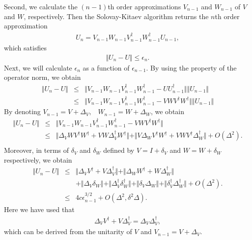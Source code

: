 Second, we calculate the $(n-1)$th order approximations $V_{n-1}$ and $W_{n-1}$ of $V$ and $W$, respectively. 
Then the Solovay-Kitaev algorithm returns the $n$th order approximation 
\begin{eqnarray}
U_n = V_{n-1} W_{n-1} V^{\dag}_{n-1} W^{\dag}_{n-1} U_{n-1},
\end{eqnarray}
which satisfies 
\begin{eqnarray}
\Vert  U_n - U \Vert  \leq \epsilon _{n}.
\end{eqnarray}
Next, we will calculate $\epsilon _{n}$ as a function of $\epsilon _{n-1}$.
By using the property of the operator norm, we obtain 
\begin{eqnarray}
\Vert  U_n - U \Vert  &\leq &
\Vert V_{n-1} W_{n-1} V^{\dag}_{n-1} W^{\dag}_{n-1} - U U_{n-1}^{\dag} \Vert  \Vert  U_{n-1} \Vert 
\\
&\leq& 
\Vert V_{n-1} W_{n-1} V^{\dag}_{n-1} W^{\dag}_{n-1} - VWV^{\dag}W^{\dag} \Vert 
 \Vert  U_{n-1} \Vert 
\end{eqnarray}
By denoting
$V_{n-1} = V+ \Delta _V, \;\;\;  W_{n-1} = W+ \Delta _W$,
we obtain
\begin{eqnarray}
\Vert  U_n - U \Vert  &\leq & \Vert V_{n-1} W_{n-1} V^{\dag}_{n-1} W^{\dag}_{n-1} - VWV^{\dag}W^{\dag} \Vert 
 \\ &\leq &
\Vert   \Delta _V W V^{\dag} W^{\dag} 
+ VW  \Delta_V^{\dag} W^{\dag}   \Vert 
+
\Vert   V \Delta _W V^{\dag} W^{\dag} 
+  VW V^{\dag} \Delta_W^{\dag} \Vert 
+O(\Delta ^2).
\nonumber \\
\end{eqnarray}
Moreover, in terms of $\delta _V$ and $\delta _W$
defined by $V= I+ \delta _V$ and $W = W+ \delta _W$
respectively,
we obtain
\begin{eqnarray}
 \Vert  U_n - U \Vert  &\leq &
\Vert   \Delta _V  V^{\dag} 
+ V  \Delta_V^{\dag}    \Vert  
+
\Vert   \Delta _W  W^{\dag} 
+  W \Delta_W^{\dag} \Vert  
\\
&&
+ \Vert \Delta _V \delta _{W}\Vert 
+\Vert \Delta _V^{\dag} \delta _{W}^{\dag}\Vert 
+\Vert  \delta _V \Delta _W \Vert  + \Vert  \delta _V^{\dag} \Delta_W^{\dag}\Vert + O(\Delta ^2). 
\\ &\leq &
4 c\epsilon _{n-1}^{3/2}+O(\Delta ^2, \delta^2 \Delta) .
\end{eqnarray}
Here we have used that 
\begin{eqnarray}
\Delta _V  V^{\dag} 
+ V  \Delta_V^{\dag}   = \Delta _V \Delta _{V}^{\dag},
\end{eqnarray}
which can be derived from the unitarity of $V$ and $V_{n-1}=V+\Delta _V$.
